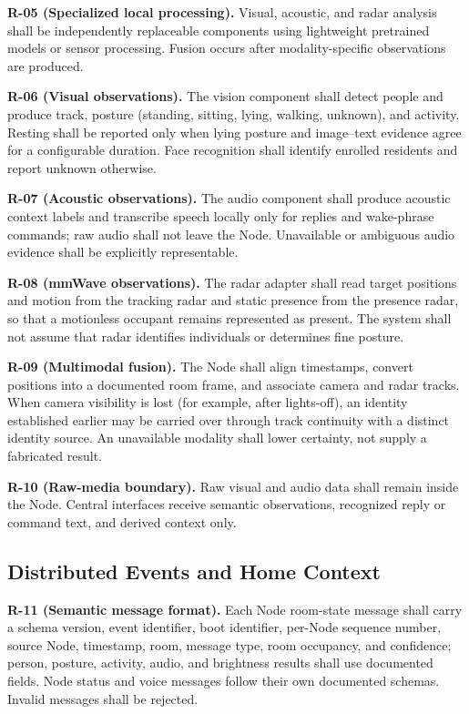 \documentclass[conference]{IEEEtran}
\begin{document}
\textbf{R-05 (Specialized local processing).}
Visual, acoustic, and radar analysis shall be independently
replaceable components using lightweight pretrained models or
sensor processing. Fusion occurs after modality-specific
observations are produced.

\textbf{R-06 (Visual observations).}
The vision component shall detect people and produce track,
posture (standing, sitting, lying, walking, unknown), and activity.
Resting shall be reported only when lying posture and image--text
evidence agree for a configurable duration. Face recognition shall
identify enrolled residents and report unknown otherwise.

\textbf{R-07 (Acoustic observations).}
The audio component shall produce acoustic context labels and
transcribe speech locally only for replies and wake-phrase
commands; raw audio shall not leave the Node. Unavailable or
ambiguous audio evidence shall be explicitly representable.

\textbf{R-08 (mmWave observations).}
The radar adapter shall read target positions and motion from the
tracking radar and static presence from the presence radar, so that
a motionless occupant remains represented as present. The system
shall not assume that radar identifies individuals or determines
fine posture.

\textbf{R-09 (Multimodal fusion).}
The Node shall align timestamps, convert positions into a
documented room frame, and associate camera and radar tracks. When
camera visibility is lost (for example, after lights-off), an
identity established earlier may be carried over through track
continuity with a distinct identity source. An unavailable
modality shall lower certainty, not supply a fabricated result.

\textbf{R-10 (Raw-media boundary).}
Raw visual and audio data shall remain inside the Node. Central
interfaces receive semantic observations, recognized reply or
command text, and derived context only.

\subsection{Distributed Events and Home Context}

\textbf{R-11 (Semantic message format).}
Each Node room-state message shall carry a schema version, event
identifier, boot identifier, per-Node sequence number, source Node,
timestamp, room, message type, room occupancy, and confidence;
person, posture, activity, audio, and brightness results shall use
documented fields. Node status and voice messages follow their own
documented schemas. Invalid messages shall be rejected.
\end{document}
